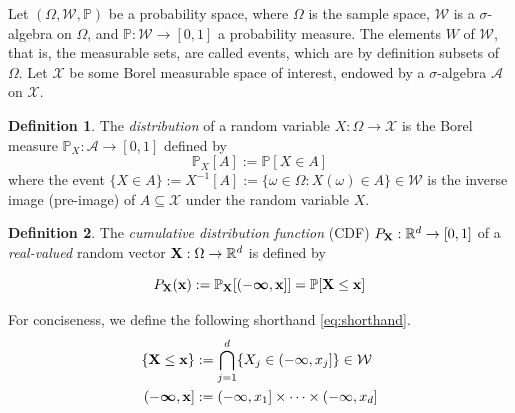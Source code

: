 \documentclass[twoside]{article} \usepackage{aistats2017}
\theoremstyle{definition}
\newtheorem{definition}{Definition}[section]
\theoremstyle{theorem}
\newcommand{\rv}[1]{{#1}}
\begin{document}
%
%
	Let $(\Omega, \mathcal{W}, \mathbb{P})$ be a probability space, where $\Omega$ is the sample space, $\mathcal{W}$ is a $\sigma$-algebra on $\Omega$, and $\mathbb{P} : \mathcal{W} \to [0, 1]$ a probability measure. The elements $W$ of $\mathcal{W}$, that is, the measurable sets, are called events, which are by definition subsets of $\Omega$. Let $\mathcal{X}$ be some Borel measurable space of interest, endowed by a $\sigma$-algebra $\mathcal{A}$ on $\mathcal{X}$.
%
%
	
	\begin{definition} \label{def:distribution}
		\citep{bauer1981probability}
		The \textit{distribution} of a random variable $\rv{X} : \Omega \to \mathcal{X}$ is the Borel measure $\mathbb{P}_{\rv{X}} : \mathcal{A} \to [0, 1]$ defined by
		\begin{equation}
			\mathbb{P}_{\rv{X}}[A] := \mathbb{P}[\rv{X} \in A]
		\label{eq:distribution}
		\end{equation}
		where the event $\{\rv{X} \in A\} := \rv{X}^{-1}[A] := \{\omega \in \Omega : \rv{X}(\omega) \in A\} \in \mathcal{W}$ is the inverse image (pre-image) of $A \subseteq \mathcal{X}$ under the random variable $\rv{X}$.
	\end{definition}
	
	\begin{definition} \label{def:cdf}
		\citep{bauer1981probability}
		The \textit{cumulative distribution function} (CDF) $P_{\bvec{\rv{X}}} : \mathbb{R}^{d} \to [0, 1]$ of a \textit{real-valued} random vector $\bvec{\rv{X}} : \Omega \to \mathbb{R}^{d}$ is defined by
		
		\begin{equation}
				P_{\bvec{\rv{X}}}(\bvec{x}) := \mathbb{P}_{\bvec{\rv{X}}}[(-\bm{\infty}, \bvec{x}]] = \mathbb{P}[\bvec{\rv{X}} \leq \bvec{x}]
		\label{eq:cdf}
		\end{equation}

		For conciseness, we define the following shorthand \eqref{eq:shorthand}. 
		\begin{equation}
			\begin{aligned}
				\{\bvec{\rv{X}} \leq \bvec{x}\} &:= \bigcap\limits_{j = 1}^{d} \{\rv{X}_{j} \in (-\infty, x_{j}]\} \in \mathcal{W} \\
				(-\bm{\infty}, \bvec{x}] &:= (-\infty, x_{1}] \times \dots \times (-\infty, x_{d}] \\
			\end{aligned}
		\label{eq:shorthand}
		\end{equation}
	\end{definition}
		
\end{document}
